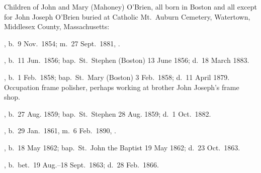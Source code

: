 \begin{KidsIntro}
	Children of John and Mary (Mahoney) O'Brien, all born in Boston and all except for John Joseph O'Brien buried at Catholic Mt.\ Auburn Cemetery, Watertown, Middlesex County, Massachusetts:\cite{BillMcEvoy:3}
\end{KidsIntro}

\begin{Kids}
	, b.\ 9 Nov.\ 1854; m.\ 27 Sept.\ 1881, .
	
	, b.\ 11 Jun.\ 1856;\cite{Mary3OBrienBirth} bap.\ St.\ Stephen (Boston) 13 June 1856;\cite{Mary3OBrienBaptism} d.\ 18 March 1883.\cite{Mary3OBrienDeath}
	
	, b.\ 1 Feb.\ 1858;\cite{James3OBrienBirth} bap.\ St.\ Mary (Boston) 3 Feb.\ 1858;\cite{James3OBrienBaptism} d.\ 11 April 1879. Occupation frame polisher,\cite{James3OBrienDeath} perhaps working at brother John Joseph's frame shop.
	
	, b.\ 27 Aug. 1859;\cite{Ellen3OBrien2Baptism:1} bap.\ St.\ Stephen 28 Aug. 1859;\cite{Ellen3OBrien2Baptism:2} d.\ 1 Oct.\ 1882.\cite{Ellen3OBrien2Death}
	
	, b.\ 29 Jan.\ 1861, m.\ 6 Feb.\ 1890, .
	
	, b.\ 18 May 1862;\cite{Margaret3OBrienBaptism:1} bap.\ St.\ John the Baptist 19 May 1862;\cite{Margaret3OBrienBaptism:2} d.\ 23 Oct.\ 1863.\cite{Margaret3OBrienDeath}
	
	, b.\ bet.\ 19 Aug.--18 Sept.\ 1863;\cite{Anna3OBrienDeath:1} d.\ 28 Feb.\ 1866.\cite{Anna3OBrienDeath:2}
	
\end{Kids}